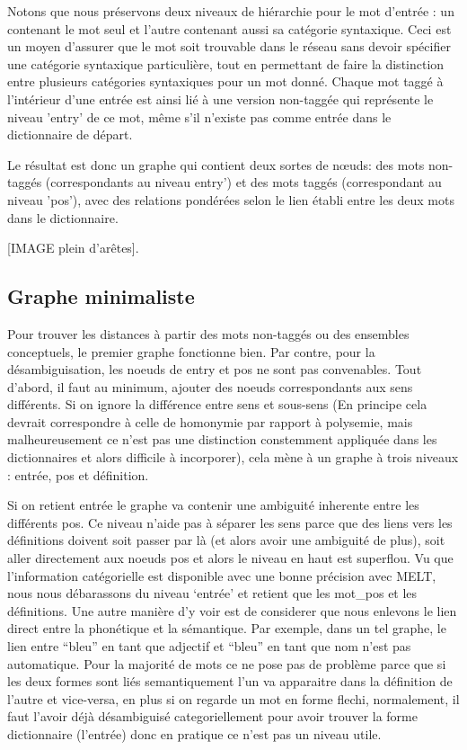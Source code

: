 Notons que nous préservons deux niveaux de hiérarchie pour le mot d'entrée : un 
contenant le mot seul et l'autre contenant aussi sa catégorie syntaxique. Ceci 
est un moyen d'assurer que le mot soit trouvable dans le réseau sans devoir 
spécifier une catégorie syntaxique particulière, tout en permettant de faire la 
distinction entre plusieurs catégories syntaxiques pour un mot donné. Chaque mot 
taggé à l'intérieur d'une entrée est ainsi lié à une version non-taggée qui 
représente le niveau 'entry' de ce mot, même s'il n'existe pas comme entrée dans 
le dictionnaire de départ.

Le résultat est donc un graphe qui contient deux sortes de nœuds: des mots 
non-taggés (correspondants au niveau entry') et des mots taggés (correspondant 
au niveau 'pos'), avec des relations pondérées selon le lien établi entre les 
deux mots dans le dictionnaire.

[IMAGE plein d'arêtes].

\subsection{Graphe minimaliste}

Pour trouver les distances à partir des mots non-taggés ou des ensembles
conceptuels, le premier graphe fonctionne bien. Par contre, pour
la désambiguisation, les noeuds de entry et pos ne sont pas convenables.
Tout d'abord, il faut au minimum, ajouter des noeuds correspondants aux sens
différents. Si on ignore la différence entre sens et sous-sens (En principe
cela devrait correspondre à celle de homonymie par rapport à polysemie,
mais malheureusement ce n'est pas une distinction constemment appliquée
dans les dictionnaires et alors difficile à incorporer), cela mène à un
graphe à trois niveaux : entrée, pos et définition.

Si on retient entrée le graphe va contenir une ambiguité inherente
entre les différents pos. Ce niveau n'aide pas à séparer les
sens parce que des liens vers les définitions doivent soit passer par
là (et alors avoir une ambiguité de plus), soit aller directement aux noeuds
pos et alors le niveau en haut est superflou. Vu que l'information
catégorielle est disponible avec une bonne précision avec MELT, nous nous
débarassons du niveau `entrée' et retient que les mot\_pos et les définitions.
Une autre manière d'y voir est de considerer que nous enlevons le lien direct
entre la phonétique et la sémantique. Par exemple, dans un tel graphe,
 le lien entre ``bleu''
en tant que adjectif et ``bleu'' en tant que nom n'est pas automatique.
Pour la majorité de mots ce ne pose pas de problème parce que si les deux
formes sont liés semantiquement l'un va apparaitre dans la définition
de l'autre et vice-versa, en plus si on regarde un mot en forme flechi,
normalement, il
faut l'avoir déjà désambiguisé categoriellement pour avoir trouver la forme
dictionnaire (l'entrée) donc en pratique ce n'est pas un niveau utile.

